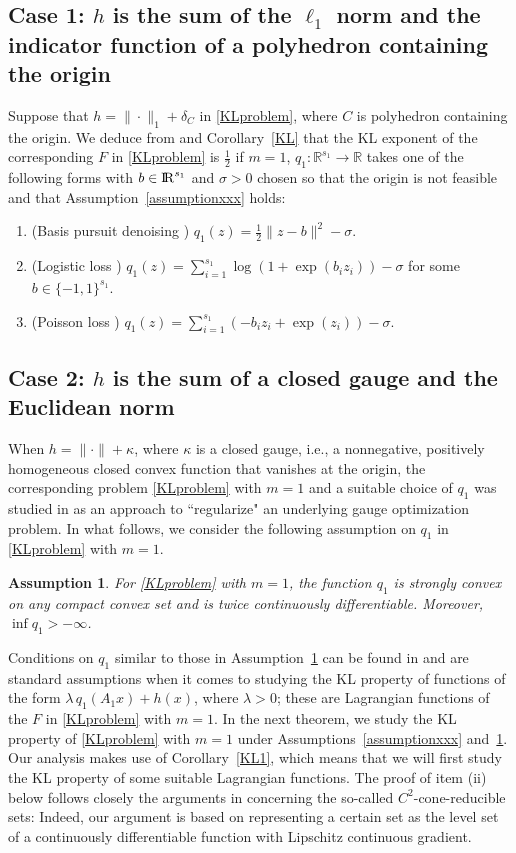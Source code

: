 \documentclass[10pt]{article}
\numberwithin{equation}{section}
\newtheorem{assumption}{Assumption}[section]
\def\R{{\rm I\!R}}
\begin{document}
\subsection{Case 1: $h$ is the sum of the $\ell_1$ norm and the indicator function of a polyhedron containing the origin}
Suppose that $h = \|\cdot\|_1 + \delta_C$ in \eqref{KLproblem}, where $C$ is polyhedron containing the origin. We deduce from \cite[Corollary~5.1]{LiPong18} and Corollary~\ref{KL} that the KL exponent of the corresponding $F$ in \eqref{KLproblem} is $\frac{1}{2}$ if $m = 1$, $q_1:\mathbb{R}^{s_1} \rightarrow \mathbb{R}$ takes one of the following forms with $b\in \R^{s_1}$ and $\sigma > 0$ chosen so that the origin is not feasible and that Assumption~\ref{assumptionxxx} holds:
\begin{enumerate}[{\rm (i)}]
   \item (Basis pursuit denoising \cite{Ca18}) $q_1(z) = \frac{1}{2}\|z - b\|^2 - \sigma$.
   \item (Logistic loss \cite{HoLS13}) $q_1(z) = \sum_{i=1}^{s_1}\log(1 + \exp(b_iz_i)) - \sigma$ for some $b\in \{-1,1\}^{s_1}$.
   \item (Poisson loss \cite{zo04}) $q_1(z) = \sum_{i=1}^{s_1}(-b_iz_i + \exp(z_i)) - \sigma$.
 \end{enumerate}

\subsection{Case 2: $h$ is the sum of a closed gauge and the Euclidean norm}
When $h = \|\cdot\| + \kappa$, where $\kappa$ is a closed gauge, i.e., a nonnegative, positively homogeneous closed convex function that vanishes at the origin, the corresponding problem \eqref{KLproblem} with $m = 1$ and a suitable choice of $q_1$ was studied in \cite[Section~6.1]{FrMP19} as an approach to ``regularize" an underlying gauge optimization problem. In what follows, we consider the following assumption on $q_1$ in \eqref{KLproblem} with $m = 1$.
\begin{assumption}\label{EllStrCon}
For \eqref{KLproblem} with $m = 1$, the function $q_1$ is strongly convex on any compact convex set and is twice continuously differentiable. Moreover, $\inf q_1 > -\infty$.
\end{assumption}
Conditions on $q_1$ similar to those in Assumption~\ref{EllStrCon} can be found in \cite{ZhSo17,LiPong18} and are standard assumptions when it comes to studying the KL property of functions of the form $\lambda \, q_1(A_1x) + h(x)$, where $\lambda > 0$; these are Lagrangian functions of the $F$ in \eqref{KLproblem} with $m = 1$. In the next theorem, we study the KL property of \eqref{KLproblem} with $m = 1$ under Assumptions~\ref{assumptionxxx} and~\ref{EllStrCon}. Our analysis makes use of Corollary~\ref{KL1}, which means that we will first study the KL property of some suitable Lagrangian functions. The proof of item (ii) below follows closely the arguments in \cite[Theorem~4.4]{YuLiPo19} concerning the so-called $C^2$-cone-reducible sets: Indeed, our argument is based on representing a certain set as the level set of a continuously differentiable function with Lipschitz continuous gradient.
\end{document}
